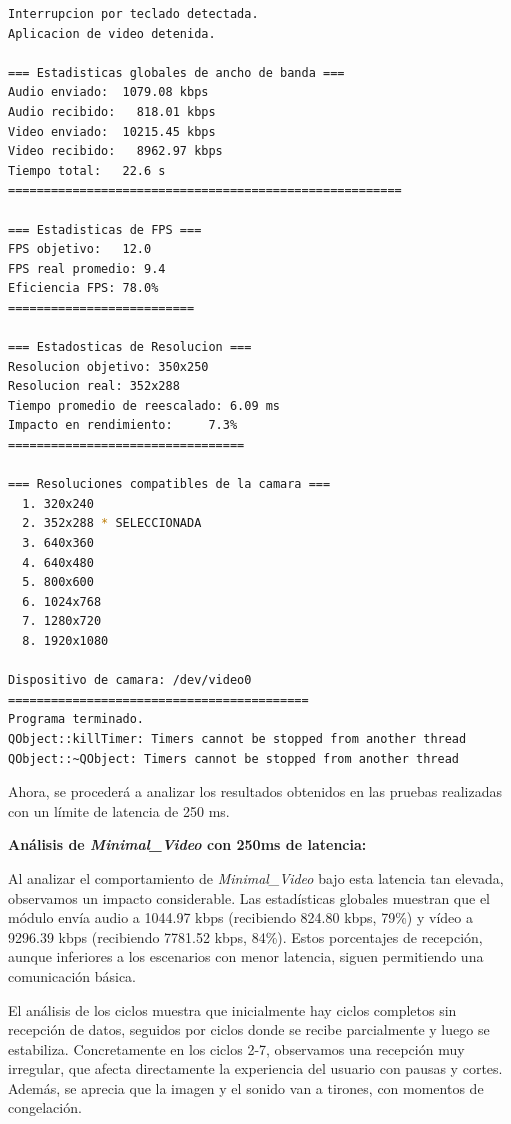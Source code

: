 \begin{lstlisting}[language=bash,basicstyle=\ttfamily\scriptsize]
Interrupcion por teclado detectada.
Aplicacion de video detenida.

=== Estadisticas globales de ancho de banda ===
Audio enviado:	1079.08 kbps
Audio recibido:   818.01 kbps
Video enviado:	10215.45 kbps
Video recibido:   8962.97 kbps
Tiempo total: 	22.6 s
=======================================================

=== Estadisticas de FPS ===
FPS objetivo: 	12.0
FPS real promedio: 9.4
Eficiencia FPS:	78.0%
==========================

=== Estadosticas de Resolucion ===
Resolucion objetivo: 350x250
Resolucion real: 352x288
Tiempo promedio de reescalado: 6.09 ms
Impacto en rendimiento:    	7.3%
=================================

=== Resoluciones compatibles de la camara ===
  1. 320x240
  2. 352x288 * SELECCIONADA
  3. 640x360
  4. 640x480
  5. 800x600
  6. 1024x768
  7. 1280x720
  8. 1920x1080

Dispositivo de camara: /dev/video0
==========================================
Programa terminado.
QObject::killTimer: Timers cannot be stopped from another thread
QObject::~QObject: Timers cannot be stopped from another thread
\end{lstlisting}
\vspace{\baselineskip}

\newpage

Ahora, se procederá a analizar los resultados obtenidos en las pruebas realizadas con un límite de latencia de 250 ms.
\vspace{\baselineskip}

\textbf{Análisis de \textit{Minimal\_Video} con 250ms de latencia:}
\vspace{\baselineskip}

Al analizar el comportamiento de \textit{Minimal\_Video} bajo esta latencia tan elevada, observamos un impacto considerable. Las estadísticas globales muestran que el módulo envía audio a 1044.97 kbps (recibiendo 824.80 kbps, 79\%) y vídeo a 9296.39 kbps (recibiendo 7781.52 kbps, 84\%). Estos porcentajes de recepción, aunque inferiores a los escenarios con menor latencia, siguen permitiendo una comunicación básica.
\vspace{\baselineskip}

El análisis de los ciclos muestra que inicialmente hay ciclos completos sin recepción de datos, seguidos por ciclos donde se recibe parcialmente y luego se estabiliza. Concretamente en los ciclos 2-7, observamos una recepción muy irregular, que afecta directamente la experiencia del usuario con pausas y cortes. Además, se aprecia que la imagen y el sonido van a tirones, con momentos de congelación.


